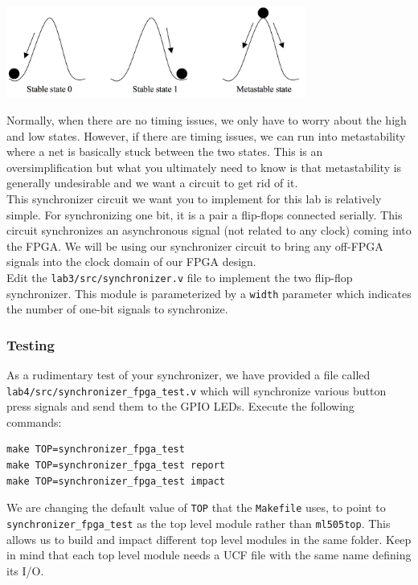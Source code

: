 \documentclass[11pt]{article}
\begin{document}
\begin{center}
\includegraphics[height=3cm]{images/lab2_fig3.png}
\end{center}

Normally, when there are no timing issues, we only have to worry about the high and low states. However, if there are timing issues, we can run into metastability where a net is basically stuck between the two states. This is an oversimplification but what you ultimately need to know is that metastability is generally undesirable and we want a circuit to get rid of it. \\

This synchronizer circuit we want you to implement for this lab is relatively simple. For synchronizing one bit, it is a pair a flip-flops connected serially. This circuit synchronizes an asynchronous signal (not related to any clock) coming into the FPGA. We will be using our synchronizer circuit to bring any off-FPGA signals into the clock domain of our FPGA design.\\

Edit the \verb|lab3/src/synchronizer.v| file to implement the two flip-flop synchronizer. This module is parameterized by a \verb|width| parameter which indicates the number of one-bit signals to synchronize.

\subsubsection{Testing}
As a rudimentary test of your synchronizer, we have provided a file called \verb|lab4/src/synchronizer_fpga_test.v| which will synchronize various button press signals and send them to the GPIO LEDs. Execute the following commands:

\begin{verbatim}
make TOP=synchronizer_fpga_test
make TOP=synchronizer_fpga_test report
make TOP=synchronizer_fpga_test impact
\end{verbatim} 

We are changing the default value of \verb|TOP| that the \verb|Makefile| uses, to point to \verb|synchronizer_fpga_test| as the top level module rather than \verb|ml505top|. This allows us to build and impact different top level modules in the same folder. Keep in mind that each top level module needs a UCF file with the same name defining its I/O.
\end{document}
